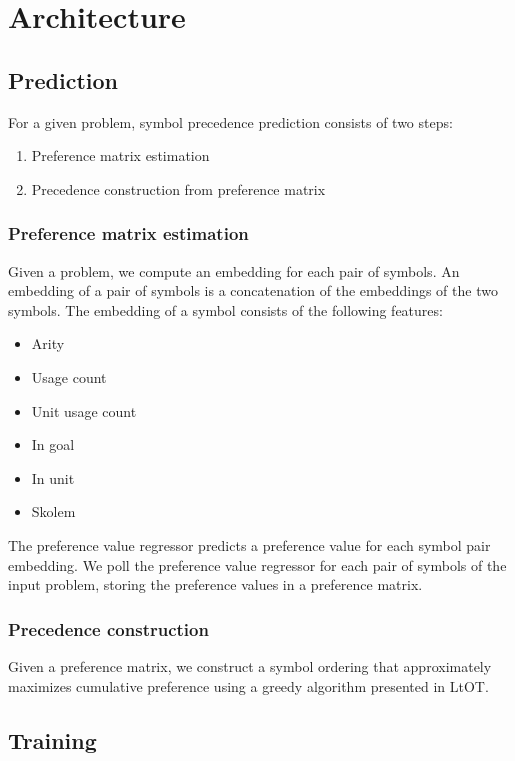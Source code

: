 \section{Architecture}

\subsection{Prediction}

For a given problem, symbol precedence prediction consists of two steps:

\begin{enumerate}
	\item Preference matrix estimation
	\item Precedence construction from preference matrix
\end{enumerate}

\subsubsection{Preference matrix estimation}

Given a problem, we compute an embedding for each pair of symbols.
An embedding of a pair of symbols is a concatenation of the embeddings of the two symbols.
The embedding of a symbol consists of the following features:

\begin{itemize}
	\item Arity
	\item Usage count
	\item Unit usage count
	\item In goal
	\item In unit
	\item Skolem
\end{itemize}

The preference value regressor predicts a preference value for each symbol pair embedding.
We poll the preference value regressor for each pair of symbols of the input problem,
storing the preference values in a preference matrix.

\subsubsection{Precedence construction}

Given a preference matrix, we construct a symbol ordering
that approximately maximizes cumulative preference
using a greedy algorithm presented in LtOT.

\subsection{Training}

